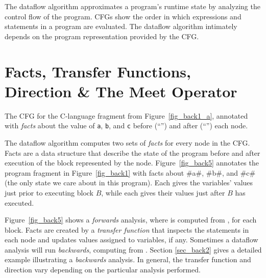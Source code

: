 \documentclass[12pt]{report}
\begin{document}
The dataflow algorithm approximates a program's runtime state by
analyzing the control flow of the program. CFGs show the order in
which expressions and statements in a program are evaluated. The
dataflow algorithm intimately depends on the program representation
provided by the CFG.

\section{Facts, Transfer Functions, Direction \& The Meet Operator}
\label{sec_back4}


\begin{myfig}[th]
\centering

\caption{The CFG for the C-language fragment from
  Figure~\ref{fig_back1_a}, annotated with \emph{facts} about the
  value of \texttt{a}, \texttt{b}, and \texttt{c} before (``\inBa'') and
  after (``\outBa'') each node.}
\label{fig_back5}
\end{myfig}

The dataflow algorithm computes two sets of \emph{facts} for every
node in the CFG. Facts are a data structure that describe the state of
the program before and after execution of the block represented by the
node. Figure~\ref{fig_back5} annotates the program fragment in
Figure~\ref{fig_back1} with facts about #a#, #b#, and #c# (the only
state we care about in this program). Each \inBa gives the variables'
values just prior to executing block $B$, while each \outBa gives
their values just after $B$ has executed.  

Figure~\ref{fig_back5} shows a \emph{forwards} analysis, where \outBa
is computed from \inBa, for each block. Facts are created by a
\emph{transfer function} that inspects the statements in each node and
updates values assigned to variables, if any. Sometimes a dataflow
analysis will run \emph{backwards}, computing \inBa from
\outBa. Section \ref{sec_back2} gives a detailed example illustrating
a \emph{backwards} analysis. In general, the transfer function and
direction vary depending on the particular analysis performed.
\end{document}
